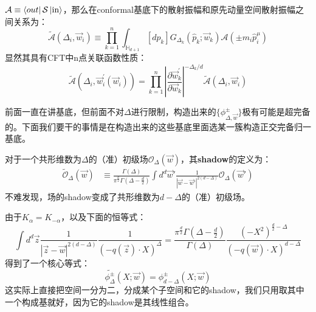 $\mathcal{A}\equiv\bra{out}\mathcal{S}\ket{\text{in}}$，那么在conformal基底下的散射振幅和原先动量空间散射振幅之间关系为：
\begin{equation}
	\widetilde{\mathcal{A}}(\Delta_i,\vec{w}_i)\equiv\prod_{k=1}^n\int_{\mathbb{H}_{d+1}}[d\hat{p}_k]G_{\Delta_k}(\hat{p}_k;\vec{w}_k)\mathcal{A}(\pm m_i\hat{p}_i^\mu)
\end{equation}
显然其具有CFT中n点关联函数性质：
\begin{equation}
	\widetilde{\mathcal A}(\Delta_{i},\vec{w}_{i}^{\prime}(\vec{w}_{i}))=\prod_{k=1}^{n}\left|\frac{\partial\vec{w}_{k}^{\prime}}{\partial\vec{w}_{k}}\right|^{-\Delta_{k}/d}\widetilde{\mathcal A}(\Delta_{i},\vec{w}_{i})
\end{equation}

前面一直在讲基底，但前面不对$\Delta$进行限制，构造出来的$\{\phi^{\pm}_{\Delta,\vec{w}}\}$极有可能是超完备的。下面我们要干的事情是在构造出来的这些基底里面选某一簇构造正交完备归一基底。

\begin{definition}
	对于一个共形维数为$\Delta$的（准）初级场$\mathcal{O}_\Delta(\vec{w})$，其\textbf{shadow}的定义为\cite{Ferrara:1972xe,Ferrara:1972ay,Ferrara:1972uq,Ferrara:1972kab}：
	\begin{equation}
		\begin{aligned}\widetilde{\mathcal{O}}_\Delta(\vec{w})&\equiv\frac{\Gamma(\Delta)}{\pi^{\frac{d}{2}}\Gamma(\Delta-\frac{d}{2})}\int d^d\vec{w}'\frac{1}{|\vec{w}-\vec{w}'|^{2(d-\Delta)}}\mathcal{O}_\Delta(\vec{w}')\end{aligned}
	\end{equation}
	不难发现，场的shadow变成了共形维数为$d-\Delta$的（准）初级场。
\end{definition}
由于$K_\alpha=K_{-\alpha}$，以及下面的恒等式\cite{Simmons-Duffin:2012juh}：
\begin{equation}
	\int d^{d}\vec{z}\frac{1}{|\vec{z}-\vec{w}|^{2(d-\Delta)}}\frac{1}{(-q(\vec{z})\cdot X)^{\Delta}}=\frac{\pi^{\frac{d}{2}}\Gamma(\Delta-\frac{d}{2})}{\Gamma(\Delta)}\frac{(-X^{2})^{\frac{d}{2}-\Delta}}{(-q(\vec{w})\cdot X)^{d-\Delta}}
\end{equation}
得到了一个核心等式：
\begin{equation}\label{eq:27.17}
	\boxed{\widetilde{\phi_\Delta^\pm}(X;\vec{w})=\phi_{d-\Delta}^\pm(X;\vec{w})}
\end{equation}
这实际上直接把空间一分为二，分成某个子空间和它的shadow，我们只用取其中一个构成基就好，因为它的shadow是其线性组合。

